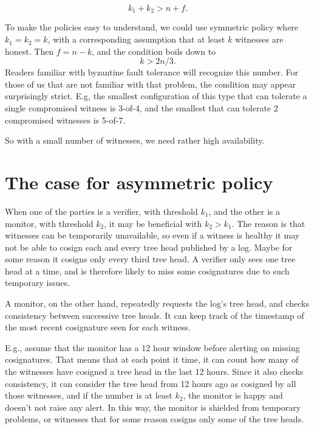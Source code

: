 \documentclass[a4paper]{article}
\begin{document}
\begin{equation}
  k_1 + k_2 > n + f. \label{eq:majority-condition}
\end{equation}

To make the policies easy to understand, we could use symmetric policy
where $k_1 = k_2 = k$, with a corresponding assumption that at least
$k$ witnesses are honest. Then $f = n - k$, and the condition boils
down to
\begin{equation}
  k > 2n/3.  %
\end{equation}
Readers familiar with byzantine fault tolerance will recognize this
number. For those of us that are not familiar with that problem, the
condition may appear surprisingly strict. E.g, the smallest
configuration of this type that can tolerate a single compromised
witness is 3-of-4, and the smallest that can tolerate 2 compromised
witnesses is 5-of-7.

So with a small number of witnesses, we need rather high availability.

\section{The case for asymmetric policy}

When one of the parties is a verifier, with threshold $k_1$, and the
other is a monitor, with threshold $k_2$, it may be beneficial with
$k_2 > k_1$. The reason is that witnesses can be temporarily
unavailable, so even if a witness is healthy it may not be able to
cosign each and every tree head published by a log. Maybe for some
reason it cosigns only every third tree head. A verifier only sees
one tree head at a time, and is therefore likely to miss some cosignatures due
to such temporary issues.

A monitor, on the other hand, repeatedly requests the log's tree head,
and checks consistency between successive tree heads. It can keep track
of the timestamp of the most recent cosignature seen for each witness.

E.g., assume that the monitor has a 12 hour window before alerting on
missing cosignatures. That means that at each point it time, it can
count how many of the witnesses have cosigned a tree head in the last
12 hours. Since it also checks consistency, it can consider the tree
head from 12 hours ago as cosigned by all those witnesses, and if the
number is at least $k_2$, the monitor is happy and doesn't not raise
any alert. In this way, the monitor is shielded from temporary
problems, or witnesses that for some reason cosigns only some of the
tree heads.
\end{document}
